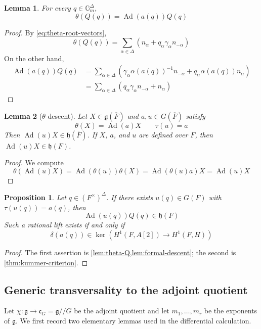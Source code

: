 \documentclass[11pt]{amsart}
\newtheorem{proposition}[proposition]{Proposition}
\newtheorem{lemma}[lemma]{Lemma}
\theoremstyle{definition}
\theoremstyle{remark}
\newcommand{\Fb}{\overline F}
\newcommand{\Gm}{\mathbb G_m}
\newcommand{\Ad}{\operatorname{Ad}}
\newcommand{\cC}{\mathfrak c}
\newcommand{\g}{\mathfrak g}
\newcommand{\h}{\mathfrak h}
\begin{document}
\begin{lemma}\label{lem:theta-Q}
For every $q\in\Gm^\Delta$,
\begin{equation}\label{eq:theta-Q}
 \theta(Q(q))=\Ad(a(q))Q(q)
\end{equation}
\end{lemma}

\begin{proof}
By \eqref{eq:theta-root-vectors},
\[
 \theta(Q(q))
 =\sum_{\alpha\in\Delta}
 \left(n_\alpha+q_\alpha\gamma_\alpha n_{-\alpha}\right)
\]
On the other hand,
\begin{align*}
 \Ad(a(q))Q(q)
 &=\sum_{\alpha\in\Delta}
 \left(
 \gamma_\alpha\alpha(a(q))^{-1}n_{-\alpha}
 +q_\alpha\alpha(a(q))n_\alpha
 \right) \\
 &=\sum_{\alpha\in\Delta}
 \left(q_\alpha\gamma_\alpha n_{-\alpha}+n_\alpha\right)
\end{align*}
\end{proof}

\begin{lemma}[$\theta$-descent]\label{lem:formal-descent}
Let $X\in\g(\Fb)$ and $a,u\in G(\Fb)$ satisfy
\[
 \theta(X)=\Ad(a)X
 \qquad
 \tau(u)=a
\]
Then $\Ad(u)X\in\h(\Fb)$.  If $X$, $a$, and $u$ are defined over $F$, then
$\Ad(u)X\in\h(F)$.
\end{lemma}

\begin{proof}
We compute
\[
 \theta(\Ad(u)X)
 =\Ad(\theta(u))\theta(X)
 =\Ad(\theta(u)a)X
 =\Ad(u)X
\]
\end{proof}

\begin{proposition}\label{prop:jacobi-descent}
Let $q\in(F^\times)^\Delta$.  If there exists $u(q)\in G(F)$ with
$\tau(u(q))=a(q)$, then
\[
 \Ad(u(q))Q(q)\in\h(F)
\]
Such a rational lift exists if and only if
\[
 \delta(a(q))\in
 \ker\left(H^1(F,A[2])\longrightarrow H^1(F,H)\right)
\]
\end{proposition}

\begin{proof}
The first assertion is \cref{lem:theta-Q,lem:formal-descent}; the second is
\cref{thm:kummer-criterion}.
\end{proof}

\subsection{Generic transversality to the adjoint quotient}
Let $\chi:\g\to\cC_G=\g/\!/G$ be the adjoint quotient and let
$m_1,\ldots,m_r$ be the exponents of $\g$.  We first record two elementary
lemmas used in the differential calculation.
\end{document}
